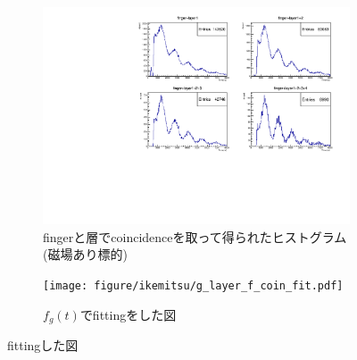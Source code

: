   \begin{figure}[H]
   \centering
   \begin{subfigure}{\columnwidth}
    \centering
    \includegraphics[height = 0.9\columnwidth , angle = -90]{figure/ikemitsu/g_layer_f_coin.pdf}
    \caption{fingerと層でcoincidenceを取って得られたヒストグラム(磁場あり標的)}
    \label{g_layercoin}
   \end{subfigure}
   \begin{subfigure}{\columnwidth}
    \centering
    \texttt{[image: figure/ikemitsu/g\_layer\_f\_coin\_fit.pdf]}
    \caption{$f_{g}(t)$でfittingをした図}
    \label{g_layercoin_fit}
   \end{subfigure}
   \caption{fittingした図}
   \label{g_layercoin_all}
  \end{figure}

  
